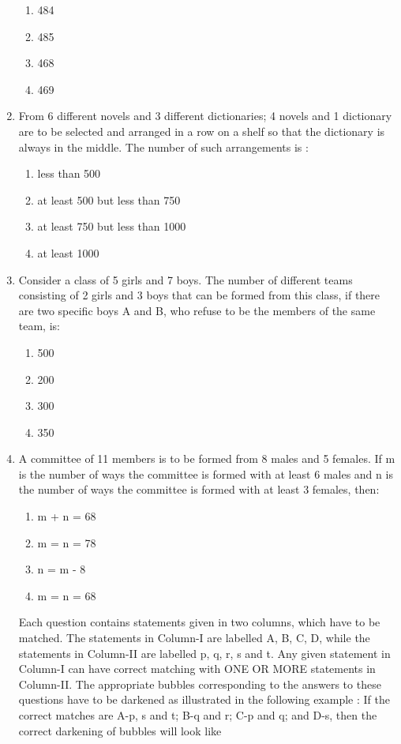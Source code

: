 \begin{enumerate}[label=\arabic*.,ref=\thesubsection.\theenumi]
\begin{enumerate}
\item 484
\item 485
\item 468
\item 469\\
\end{enumerate}
\item From 6 different novels and 3 different dictionaries; 4 novels and 1 dictionary are to be selected and arranged in a row on a shelf so that the dictionary is always in the middle. The number of such arrangements is :
\begin{enumerate}
\item less than 500
\item at least 500 but less than 750
\item at least 750 but less than 1000
\item at least 1000\\ 
\end{enumerate}
\item Consider a class of 5 girls and 7 boys. The number of different teams consisting of 2 girls and 3 boys that can be formed from this class, if there are two specific boys A and B, who refuse to be the members of the same team, is:
\begin{enumerate}
\item 500
\item 200
\item 300
\item 350\\
\end{enumerate} 
\item A committee of 11 members is to be formed from 8 males and 5 females. If m is the number of ways the committee is formed with at least 6 males and n is the number of ways the committee is formed with at least 3 females, then:
\begin{enumerate}
\item m + n = 68
\item m = n = 78
\item n = m - 8
\item m = n = 68\\
\end{enumerate}


Each question contains statements given in two columns, which have to be matched. The statements in Column-I are labelled A, B, C, D, while the statements in Column-II are labelled p, q, r, s and t. Any given statement in Column-I can have correct matching with ONE OR MORE statements in Column-II. The appropriate bubbles corresponding to the answers to these questions have to be darkened as illustrated in the following example :
If the correct matches are A-p, s and t; B-q and r; C-p and q; and D-s, then the correct darkening of bubbles will look like


\end{enumerate}
